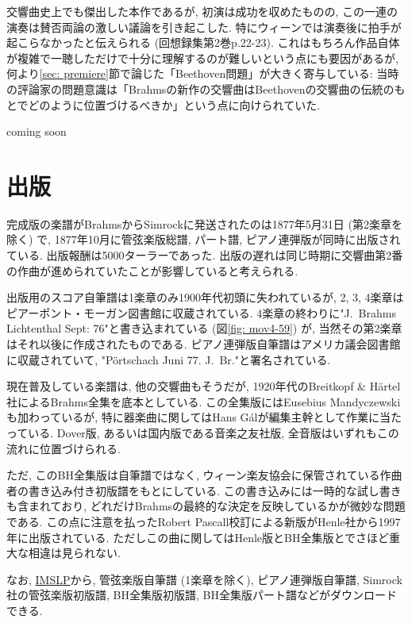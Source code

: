 交響曲史上でも傑出した本作であるが, 初演は成功を収めたものの, この一連の演奏は賛否両論の激しい議論を引き起こした\cite{compos}.
特にウィーンでは演奏後に拍手が起こらなかったと伝えられる (回想録集\cite{kaisouroku}第2巻p.22-23).
これはもちろん作品自体が複雑で一聴しただけで十分に理解するのが難しいという点にも要因があるが, 何より\ref{sec: premiere}節で論じた「Beethoven問題」が大きく寄与している:
当時の評論家の問題意識は「Brahmsの新作の交響曲はBeethovenの交響曲の伝統のもとでどのように位置づけるべきか」という点に向けられていた\cite{frisch}.

coming soon


\section{出版}

完成版の楽譜がBrahmsからSimrockに発送されたのは1877年5月31日 (第2楽章を除く) で\cite{library},
1877年10月に管弦楽版総譜, パート譜, ピアノ連弾版が同時に出版されている\cite{frisch}. 出版報酬は5000ターラーであった\cite{henle}.
出版の遅れは同じ時期に交響曲第2番の作曲が進められていたことが影響していると考えられる.

出版用のスコア自筆譜は1楽章のみ1900年代初頭に失われているが, 2, 3, 4楽章はピアーポント・モーガン図書館に収蔵されている.
4楽章の終わりに"J.~Brahms Lichtenthal Sept: 76"と書き込まれている (図\ref{fig: mov4-59}) が, 当然その第2楽章はそれ以後に作成されたものである.
ピアノ連弾版自筆譜はアメリカ議会図書館に収蔵されていて, "Pörtschach Juni 77. J.~Br."と署名されている\cite{frisch}.

現在普及している楽譜は, 他の交響曲もそうだが, 1920年代のBreitkopf \& Härtel社によるBrahms全集を底本としている.
この全集版にはEusebius Mandyczewskiも加わっているが, 特に器楽曲に関してはHans Gálが編集主幹として作業に当たっている.
Dover版, あるいは国内版である音楽之友社版\cite{ogt}, 全音版はいずれもこの流れに位置づけられる.

ただ, このBH全集版は自筆譜ではなく, ウィーン楽友協会に保管されている作曲者の書き込み付き初版譜をもとにしている.
この書き込みには一時的な試し書きも含まれており, どれだけBrahmsの最終的な決定を反映しているかが微妙な問題である.
この点に注意を払ったRobert Pascall校訂による新版がHenle社から1997年に出版されている\cite{henle}.
ただしこの曲に関してはHenle版とBH全集版とでさほど重大な相違は見られない.

なお, \href{http://imslp.org/wiki/Symphony_No.1,_Op.68_(Brahms,_Johannes)}{IMSLP}から,
管弦楽版自筆譜 (1楽章を除く), ピアノ連弾版自筆譜, Simrock社の管弦楽版初版譜, BH全集版初版譜, BH全集版パート譜などがダウンロードできる.

